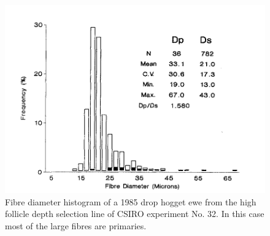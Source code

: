%

\begin{figure}[h]
  \centering
  \includegraphics[width=\textwidth,trim = 0 0 0 20]{images/fig10ri.png}
  \caption{Fibre diameter histogram of a 1985 drop hogget ewe from the high
      follicle depth selection line of CSIRO experiment No. 32.  In
      this case most of the large fibres are primaries.}

  \label{fig:10}
\end{figure}

%
